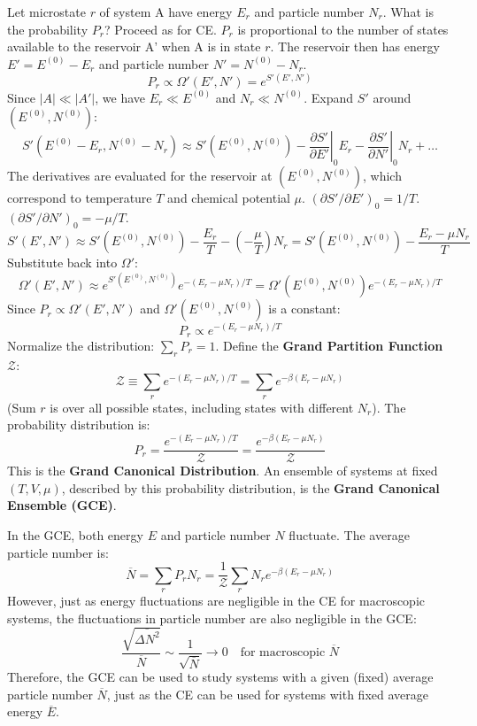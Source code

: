 \documentclass[11pt]{article}
\newcommand{\avg}[1]{\overline{#1}}
\newcommand{\pderiv}[2]{\frac{\partial #1}{\partial #2}}
\newcommand{\grandpartfn}{\mathcal{Z}} %
\begin{document}
Let microstate $r$ of system A have energy $E_r$ and particle number $N_r$. What is the probability $P_r$?
Proceed as for CE. $P_r$ is proportional to the number of states available to the reservoir A' when A is in state $r$. The reservoir then has energy $E' = E^{(0)} - E_r$ and particle number $N' = N^{(0)} - N_r$.
\[ P_r \propto \Omega'(E', N') = e^{S'(E', N')} \]
Since $|A| \ll |A'|$, we have $E_r \ll E^{(0)}$ and $N_r \ll N^{(0)}$. Expand $S'$ around $(E^{(0)}, N^{(0)})$:
\[ S'(E^{(0)}-E_r, N^{(0)}-N_r) \approx S'(E^{(0)}, N^{(0)}) - \left.\pderiv{S'}{E'}\right|_0 E_r - \left.\pderiv{S'}{N'}\right|_0 N_r + \dots \]
The derivatives are evaluated for the reservoir at $(E^{(0)}, N^{(0)})$, which correspond to temperature $T$ and chemical potential $\mu$.
$(\partial S'/\partial E')_0 = 1/T$.
$(\partial S'/\partial N')_0 = -\mu/T$.
\[ S'(E', N') \approx S'(E^{(0)}, N^{(0)}) - \frac{E_r}{T} - \left(-\frac{\mu}{T}\right) N_r = S'(E^{(0)}, N^{(0)}) - \frac{E_r - \mu N_r}{T} \]
Substitute back into $\Omega'$:
\[ \Omega'(E', N') \approx e^{S'(E^{(0)}, N^{(0)})} e^{-(E_r - \mu N_r)/T} = \Omega'(E^{(0)}, N^{(0)}) e^{-(E_r - \mu N_r)/T} \]
Since $P_r \propto \Omega'(E', N')$ and $\Omega'(E^{(0)}, N^{(0)})$ is a constant:
\[ P_r \propto e^{-(E_r - \mu N_r)/T} \]
Normalize the distribution: $\sum_r P_r = 1$.
Define the \textbf{Grand Partition Function} $\grandpartfn$:
\[ \grandpartfn \equiv \sum_r e^{-(E_r - \mu N_r)/T} = \sum_r e^{-\beta(E_r - \mu N_r)} \]
(Sum $r$ is over all possible states, including states with different $N_r$).
The probability distribution is:
\[ P_r = \frac{e^{-(E_r - \mu N_r)/T}}{\grandpartfn} = \frac{e^{-\beta(E_r - \mu N_r)}}{\grandpartfn} \]
This is the \textbf{Grand Canonical Distribution}.
An ensemble of systems at fixed $(T, V, \mu)$, described by this probability distribution, is the \textbf{Grand Canonical Ensemble (GCE)}.

In the GCE, both energy $E$ and particle number $N$ fluctuate. The average particle number is:
\[ \avg{N} = \sum_r P_r N_r = \frac{1}{\grandpartfn} \sum_r N_r e^{-\beta(E_r - \mu N_r)} \]
However, just as energy fluctuations are negligible in the CE for macroscopic systems, the fluctuations in particle number are also negligible in the GCE:
\[ \frac{\sqrt{\avg{\Delta N^2}}}{\avg{N}} \sim \frac{1}{\sqrt{\avg{N}}} \to 0 \quad \text{for macroscopic } \avg{N} \]
Therefore, the GCE can be used to study systems with a given (fixed) average particle number $\avg{N}$, just as the CE can be used for systems with fixed average energy $\avg{E}$.
\end{document}
